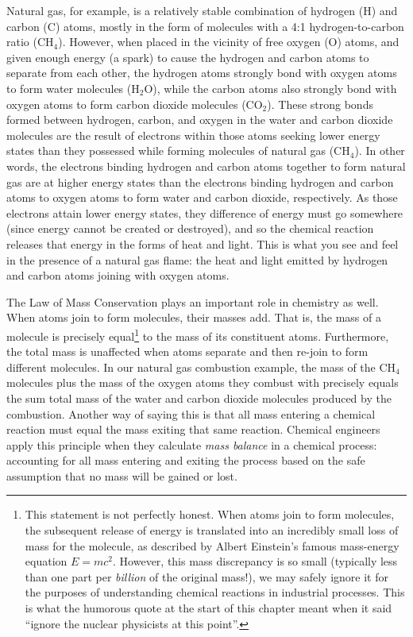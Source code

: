 Natural gas, for example, is a relatively stable combination of hydrogen (H) and carbon (C) atoms, mostly in the form of molecules with a 4:1 hydrogen-to-carbon ratio (CH$_{4}$).  However, when placed in the vicinity of free oxygen (O) atoms, and given enough energy (a spark) to cause the hydrogen and carbon atoms to separate from each other, the hydrogen atoms strongly bond with oxygen atoms to form water molecules (H$_{2}$O), while the carbon atoms also strongly bond with oxygen atoms to form carbon dioxide molecules (CO$_{2}$).  These strong bonds formed between hydrogen, carbon, and oxygen in the water and carbon dioxide molecules are the result of electrons within those atoms seeking lower energy states than they possessed while forming molecules of natural gas (CH$_{4}$).  In other words, the electrons binding hydrogen and carbon atoms together to form natural gas are at higher energy states than the electrons binding hydrogen and carbon atoms to oxygen atoms to form water and carbon dioxide, respectively.  As those electrons attain lower energy states, they difference of energy must go somewhere (since energy cannot be created or destroyed), and so the chemical reaction releases that energy in the forms of heat and light.  This is what you see and feel in the presence of a natural gas flame: the heat and light emitted by hydrogen and carbon atoms joining with oxygen atoms.

\vskip 10pt

The Law of Mass Conservation plays an important role in chemistry as well.  When atoms join to form molecules, their masses add.  That is, the mass of a molecule is precisely equal\footnote{This statement is not perfectly honest.  When atoms join to form molecules, the subsequent release of energy is translated into an incredibly small loss of mass for the molecule, as described by Albert Einstein's famous mass-energy equation $E = mc^2$.  However, this mass discrepancy is so small (typically less than one part per \textit{billion} of the original mass!), we may safely ignore it for the purposes of understanding chemical reactions in industrial processes.  This is what the humorous quote at the start of this chapter meant when it said ``ignore the nuclear physicists at this point''.} to the mass of its constituent atoms.  Furthermore, the total mass is unaffected when atoms separate and then re-join to form different molecules.  In our natural gas combustion example, the mass of the CH$_{4}$ molecules plus the mass of the oxygen atoms they combust with precisely equals the sum total mass of the water and carbon dioxide molecules produced by the combustion.  Another way of saying this is that all mass entering a chemical reaction must equal the mass exiting that same reaction.  Chemical engineers apply this principle when they calculate \textit{mass balance} in a chemical process: accounting for all mass entering and exiting the process based on the safe assumption that no mass will be gained or lost.

